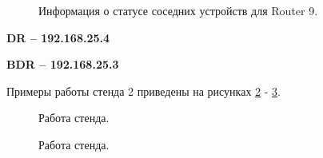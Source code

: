 \documentclass[a4paper,14pt]{article}
\begin{document}
\begin{figure}[!h]
    \caption{Информация о статусе соседних устройств для Router 9.}
    \label{fig:r9_stat}
\end{figure}

\textbf{DR -- 192.168.25.4}

\textbf{BDR -- 192.168.25.3}

Примеры работы стенда 2 приведены на рисунках \ref{fig:pr3} - \ref{fig:pr4}.

\newpage
\begin{figure}[!h]
    \caption{Работа стенда.}
    \label{fig:pr3}
\end{figure}

\begin{figure}[!h]
    \caption{Работа стенда.}
    \label{fig:pr4}
\end{figure}
\end{document}
